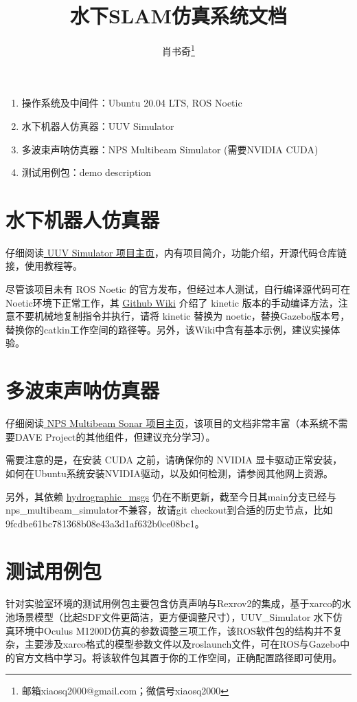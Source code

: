 \documentclass[fontset=windows]{ctexart}
\title{水下SLAM仿真系统文档}
\author{肖书奇\footnote{邮箱xiaosq2000@gmail.com；微信号xiaosq2000}}
\date{}
\begin{document}
\maketitle
\begin{enumerate}
    \item 操作系统及中间件：Ubuntu 20.04 LTS, ROS Noetic
    \item 水下机器人仿真器：UUV Simulator
    \item 多波束声呐仿真器：NPS Multibeam Simulator (需要NVIDIA CUDA)
    \item 测试用例包：demo description
\end{enumerate}
\section{水下机器人仿真器}
仔细阅读\href{https://uuvsimulator.github.io/packages/uuv_simulator/intro/}{ UUV Simulator 项目主页}，内有项目简介，功能介绍，开源代码仓库链接，使用教程等。
\par 尽管该项目未有 ROS Noetic 的官方发布，但经过本人测试，自行编译源代码可在Noetic环境下正常工作，其 \href{https://github.com/uuvsimulator/uuv_simulator/wiki}{Github Wiki} 介绍了 kinetic 版本的手动编译方法，注意不要机械地复制指令并执行，请将 kinetic 替换为 noetic，替换Gazebo版本号，替换你的catkin工作空间的路径等。另外，该Wiki中含有基本示例，建议实操体验。
\section{多波束声呐仿真器}
仔细阅读\href{https://field-robotics-lab.github.io/dave.doc/contents/dave_sensors/Multibeam-Forward-Looking-Sonar/}{ NPS Multibeam Sonar 项目主页}，该项目的文档非常丰富（本系统不需要DAVE Project的其他组件，但建议充分学习）。
\par 需要注意的是，在安装 CUDA 之前，请确保你的 NVIDIA 显卡驱动正常安装，如何在Ubuntu系统安装NVIDIA驱动，以及如何检测，请参阅其他网上资源。
\par 另外，其依赖 \href{https://github.com/apl-ocean-engineering/hydrographic_msgs}{hydrographic\_msgs} 仍在不断更新，截至今日其main分支已经与nps\_multibeam\_simulator不兼容，故请git checkout到合适的历史节点，比如9fcdbe61bc781368b08e43a3d1af632b0ce08bc1。
\section{测试用例包}
针对实验室环境的测试用例包主要包含仿真声呐与Rexrov2的集成，基于xarco的水池场景模型（比起SDF文件更简洁，更方便调整尺寸），UUV\_Simulator 水下仿真环境中Oculus M1200D仿真的参数调整三项工作，该ROS软件包的结构并不复杂，主要涉及xarco格式的模型参数文件以及roslaunch文件，可在ROS与Gazebo中的官方文档中学习。将该软件包其置于你的工作空间，正确配置路径即可使用。
\end{document}

